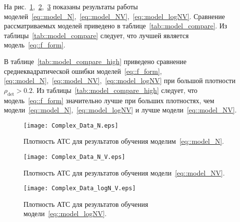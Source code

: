 На рис.~\ref{fig:cN},~\ref{fig:cNV},~\ref{fig:clogNV} показаны результаты работы моделей~\eqref{eq::model_N},~\eqref{eq::model_NV},~\eqref{eq::model_logNV}.
Сравнение рассматриваемых моделей приведено в таблице~\ref{tab::model_compare}. Из таблицы~\ref{tab::model_compare} следует, что лучшей является модель~\eqref{eq::f_form}.

В таблице~\ref{tab::model_compare_high} приведено сравнение среднеквадратической ошибки моделей~\eqref{eq::f_form},\eqref{eq::model_N},~\eqref{eq::model_NV},~\eqref{eq::model_logNV} при большой плотности $\rho_\text{det}>0.2$. Из таблицы~\ref{tab::model_compare_high} следует, что модель~\eqref{eq::f_form} значительно лучше при больших плотностях, чем модели~\eqref{eq::model_N},~\eqref{eq::model_logNV} и лучше модели~\eqref{eq::model_NV}.


\begin{figure}[!ht]
\begin{center}
\texttt{[image: Complex\_Data\_N.eps]}
\caption{Плотность АТС для результатов обучения моделим~\eqref{eq::model_N}.}
\label{fig:cN}
\end{center}
\end{figure}
\begin{figure}[!ht]
\begin{center}
\texttt{[image: Complex\_Data\_N\_V.eps]}
\caption{Плотность АТС для результатов обучения модели~\eqref{eq::model_NV}.}
\label{fig:cNV}
\end{center}
\end{figure}
\begin{figure}[!ht]
\begin{center}
\texttt{[image: Complex\_Data\_logN\_V.eps]}
\caption{Плотность АТС для результатов обучения модели~\eqref{eq::model_logNV}.}
\label{fig:clogNV}
\end{center}
\end{figure}
\begin{table}[!ht]
    \centering
    \caption{Сравнение моделей при всех значениях плотности $\rho_\text{det}$}
    \label{tab::model_compare}
\end{table}

